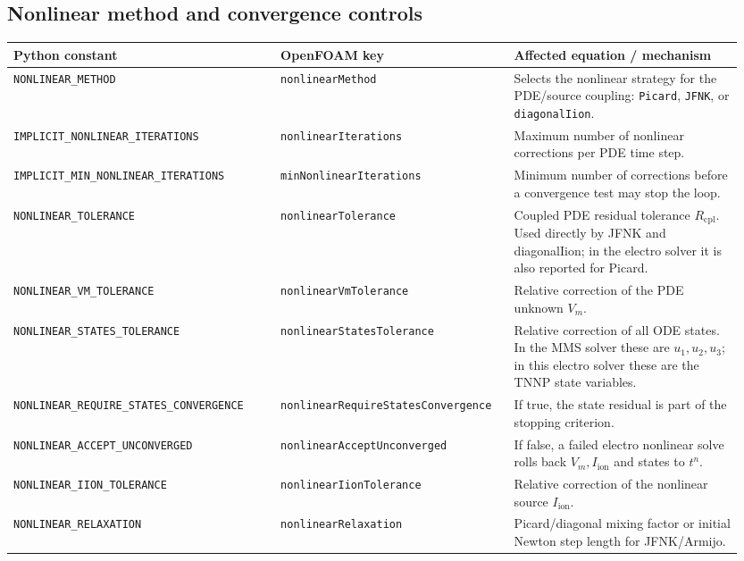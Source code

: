 \documentclass[11pt,a4paper]{article}
\newcommand{\Vm}{V_{m}}
\newcommand{\Iion}{I_{\text{ion}}}
\newcommand{\code}[1]{\texttt{\small #1}}
\begin{document}
\subsection{Nonlinear method and convergence controls}
\begin{longtable}{@{}p{0.35\linewidth}p{0.30\linewidth}p{0.30\linewidth}@{}}
\toprule
Python constant & OpenFOAM key & Affected equation / mechanism \\
\midrule \endhead
\code{NONLINEAR\_METHOD} & \code{nonlinearMethod} &
   Selects the nonlinear strategy for the PDE/source coupling:
   \code{Picard}, \code{JFNK}, or \code{diagonalIion}. \\
\code{IMPLICIT\_NONLINEAR\_ITERATIONS} & \code{nonlinearIterations} &
   Maximum number of nonlinear corrections per PDE time step. \\
\code{IMPLICIT\_MIN\_NONLINEAR\_ITERATIONS} &
   \code{minNonlinearIterations} &
   Minimum number of corrections before a convergence test may stop the
   loop. \\
\code{NONLINEAR\_TOLERANCE} & \code{nonlinearTolerance} &
   Coupled PDE residual tolerance $R_{\mathrm{cpl}}$. Used directly by
   JFNK and diagonalIion; in the electro solver it is also reported for
   Picard. \\
\code{NONLINEAR\_VM\_TOLERANCE} & \code{nonlinearVmTolerance} &
   Relative correction of the PDE unknown $\Vm$. \\
\code{NONLINEAR\_STATES\_TOLERANCE} &
   \code{nonlinearStatesTolerance} &
   Relative correction of all ODE states. In the MMS solver these are
   $u_1,u_2,u_3$; in this electro solver these are the TNNP state
   variables. \\
\code{NONLINEAR\_REQUIRE\_STATES\_CONVERGENCE} &
   \code{nonlinearRequireStatesConvergence} &
   If true, the state residual is part of the stopping criterion. \\
\code{NONLINEAR\_ACCEPT\_UNCONVERGED} &
   \code{nonlinearAcceptUnconverged} &
   If false, a failed electro nonlinear solve rolls back $\Vm,\Iion$ and
   states to $t^n$. \\
\code{NONLINEAR\_IION\_TOLERANCE} & \code{nonlinearIionTolerance} &
   Relative correction of the nonlinear source $\Iion$. \\
\code{NONLINEAR\_RELAXATION} & \code{nonlinearRelaxation} &
   Picard/diagonal mixing factor or initial Newton step length for
   JFNK/Armijo. \\
\bottomrule
\end{longtable}
\end{document}
